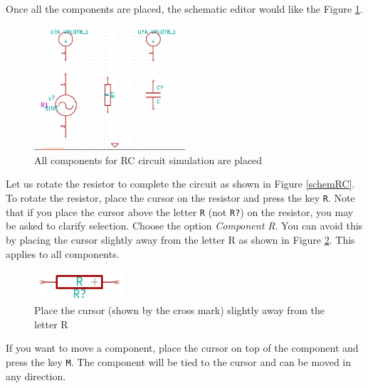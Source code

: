 Once all the components are placed, the schematic editor would like the Figure \ref{afterplace}.
\begin{figure}
\centering
\includegraphics[width=0.5\textwidth]{figures/afterplace}
\caption{All components for RC circuit simulation are placed}
\label{afterplace}
\end{figure}

Let us rotate the resistor to complete the circuit as shown in Figure \ref{schemRC}. To rotate the resistor, place the cursor on the resistor and press the key {\tt R}. Note that if you place the cursor above the letter {\tt R} (not {\tt R?}) on the resistor, you may be asked to clarify selection. Choose the option \textit{Component R}. You can avoid this by placing the cursor slightly away from the letter R as shown in Figure \ref{rotate}. This applies to all components.
\begin{figure}
\centering
\includegraphics[width=0.3\textwidth]{figures/rotate}
\caption{Place the cursor (shown by the cross mark) slightly away from the letter R}
\label{rotate}
\end{figure}

If you want to move a component, place the cursor on top of the component and press the key {\tt M}. The component will be tied to the cursor and can be moved in any direction. 
